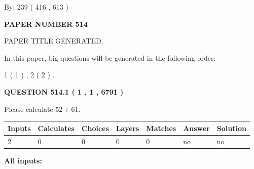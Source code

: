 \documentclass[12pt]{article}
\begin{document}
   
\hspace{1.0in} By: 
 239 ( 416 ,  613 )
   
   
   
   
\newpage 
\setcounter{page}{ 
   514001 } 
   
   
   
   
 {\textbf{ \Large{ PAPER NUMBER  514  }}}
   
   
\vspace{0.2in}
   
   
   
   
   
   
   
   
 \vspace{0.2in}
 
 
 
 
   
   
 PAPER TITLE GENERATED.
   
   
   
\vspace{0.2in}
   
In this paper, big questions will be generated in the following order: 
   
   
   1 ( 1 )
 ,
   2 ( 2 )
 .
  
\vspace{0.2in}
  
{\textbf{\Large{QUESTION
514.1 
 ( 1 , 1 , 6791 )
}}}
  
  
 
Please calculate $ %
52 +  %
61 $.
 
 
   
   
   
   
\noindent\begin{tabular}{|l|l|l|l|l|l|l|}
 \hline
Inputs & Calculates & Choices & Layers & Matches & Answer & Solution \\ \hline
 2  & 
 0  & 
 0
  & 
 0  & 
 0  & 
  no & 
  no 
  \\ \hline
 \end{tabular}
   
   
   
   
\noindent{}
   
   
   
   
\noindent\vspace{0.1in}\hspace{-0.08in} {\textbf{\Large{All inputs: }}}
   
\end{document}
